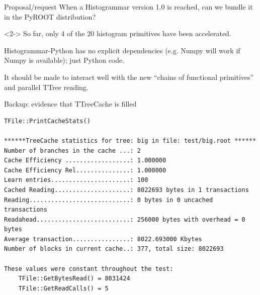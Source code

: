 \documentclass{beamer}
\begin{document}
\begin{frame}{Proposal/request}
When a Histogrammar version 1.0 is reached, can we bundle it in the PyROOT distribution?

\begin{uncoverenv}<2->
\vspace{0.5 cm}
So far, only 4 of the 20 histogram primitives have been accelerated.

\vspace{0.5 cm}
Histogrammar-Python has no explicit dependencies (e.g. Numpy will work if Numpy is available); just Python code.

\vspace{0.5 cm}
It should be made to interact well with the new ``chains of functional primitives'' and parallel TTree reading.
\end{uncoverenv}
\end{frame}

\begin{frame}[fragile]{Backup: evidence that TTreeCache is filled}
\scriptsize
\begin{lstlisting}
TFile::PrintCacheStats()

******TreeCache statistics for tree: big in file: test/big.root ******
Number of branches in the cache ...: 2
Cache Efficiency ..................: 1.000000
Cache Efficiency Rel...............: 1.000000
Learn entries......................: 100
Cached Reading.....................: 8022693 bytes in 1 transactions
Reading............................: 0 bytes in 0 uncached transactions
Readahead..........................: 256000 bytes with overhead = 0 bytes
Average transaction................: 8022.693000 Kbytes
Number of blocks in current cache..: 377, total size: 8022693

These values were constant throughout the test:
    TFile::GetBytesRead() = 8031424
    TFile::GetReadCalls() = 5
\end{lstlisting}
\end{frame}
\end{document}
